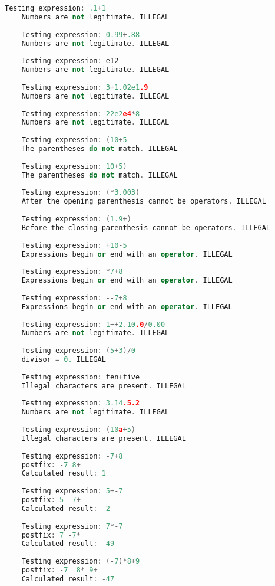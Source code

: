 \documentclass[UTF8]{ctexart}
\begin{document}
\begin{lstlisting}[language=c++, breaklines=true, frame=shadowbox, rulesepcolor=\color{red!20!green!20!blue!20}]
    Testing expression: .1+1
    Numbers are not legitimate. ILLEGAL
    
    Testing expression: 0.99+.88
    Numbers are not legitimate. ILLEGAL
    
    Testing expression: e12
    Numbers are not legitimate. ILLEGAL
    
    Testing expression: 3+1.02e1.9
    Numbers are not legitimate. ILLEGAL
    
    Testing expression: 22e2e4*8
    Numbers are not legitimate. ILLEGAL
    
    Testing expression: (10+5
    The parentheses do not match. ILLEGAL
    
    Testing expression: 10+5)
    The parentheses do not match. ILLEGAL
    
    Testing expression: (*3.003)
    After the opening parenthesis cannot be operators. ILLEGAL
    
    Testing expression: (1.9+)
    Before the closing parenthesis cannot be operators. ILLEGAL
    
    Testing expression: +10-5
    Expressions begin or end with an operator. ILLEGAL
    
    Testing expression: *7+8
    Expressions begin or end with an operator. ILLEGAL
    
    Testing expression: --7+8
    Expressions begin or end with an operator. ILLEGAL
    
    Testing expression: 1++2.10.0/0.00
    Numbers are not legitimate. ILLEGAL
    
    Testing expression: (5+3)/0
    divisor = 0. ILLEGAL
    
    Testing expression: ten+five
    Illegal characters are present. ILLEGAL
    
    Testing expression: 3.14.5.2
    Numbers are not legitimate. ILLEGAL
    
    Testing expression: (10a+5)
    Illegal characters are present. ILLEGAL
    
    Testing expression: -7+8
    postfix: -7 8+
    Calculated result: 1
    
    Testing expression: 5+-7
    postfix: 5 -7+
    Calculated result: -2
    
    Testing expression: 7*-7
    postfix: 7 -7*
    Calculated result: -49
    
    Testing expression: (-7)*8+9
    postfix: -7  8* 9+
    Calculated result: -47
    

\end{lstlisting}
\end{document}

